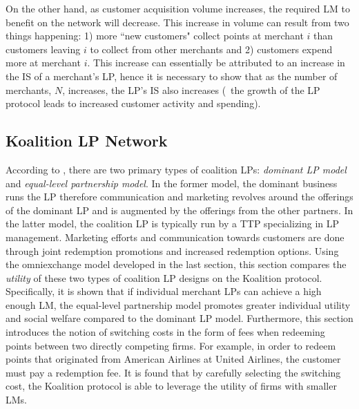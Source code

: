 On the other hand, as customer acquisition volume increases, the required LM to benefit on the network will decrease. This increase in volume can result from two things happening: 1) more ``new customers" collect points at merchant $i$ than customers leaving $i$ to collect from other merchants and 2) customers expend more at merchant $i$. This increase can essentially be attributed to an increase in the IS of a merchant's LP, hence it is necessary to show that as the number of merchants, $N$, increases, the LP's IS also increases (\ie\ the growth of the LP protocol leads to increased customer activity and spending). 

\subsection{Koalition LP Network}
%
According to \cite{Breu15}, there are two primary types of coalition LPs: \textit{dominant LP model} and \textit{equal-level partnership model}. In the former model, the dominant business runs the LP therefore communication and marketing revolves around the offerings of the dominant LP and is augmented by the offerings from the other partners. In the latter model, the coalition LP is typically run by a TTP specializing in LP management. Marketing efforts and communication towards customers are done through joint redemption promotions and increased redemption options. Using the omniexchange model developed in the last section, this section compares the \textit{utility} of these two types of coalition LP designs on the Koalition protocol. Specifically, it is shown that if individual merchant LPs can achieve a high enough LM, the equal-level partnership model promotes greater individual utility and social welfare compared to the dominant LP model. Furthermore, this section introduces the notion of switching costs in the form of fees when redeeming points between two directly competing firms. For example, in order to redeem points that originated from American Airlines at United Airlines, the customer must pay a redemption fee. It is found that by carefully selecting the switching cost, the Koalition protocol is able to leverage the utility of firms with smaller LMs. 

